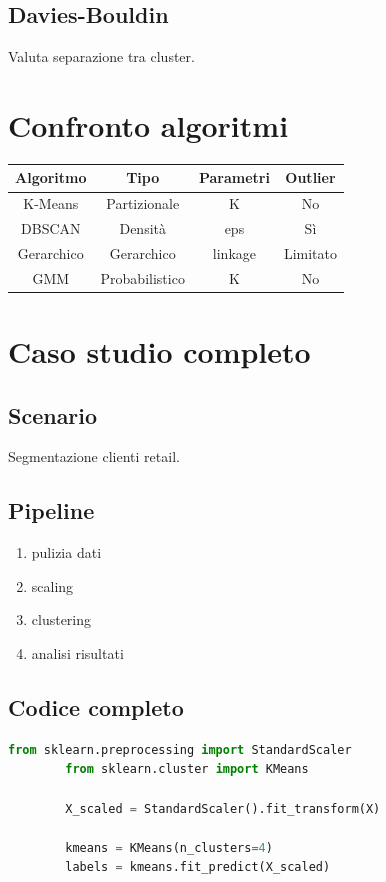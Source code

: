 \documentclass[12pt,a4paper]{article}
\begin{document}
	\subsection{Davies-Bouldin}
	
	Valuta separazione tra cluster.
	
	\section{Confronto algoritmi}
	
	\begin{longtable}{|c|c|c|c|}
		\hline
		Algoritmo & Tipo & Parametri & Outlier \\
		\hline
		K-Means & Partizionale & K & No \\
		DBSCAN & Densità & eps & Sì \\
		Gerarchico & Gerarchico & linkage & Limitato \\
		GMM & Probabilistico & K & No \\
		\hline
	\end{longtable}
	
	\section{Caso studio completo}
	
	\subsection{Scenario}
	
	Segmentazione clienti retail.
	
	\subsection{Pipeline}
	
	\begin{enumerate}
		\item pulizia dati
		\item scaling
		\item clustering
		\item analisi risultati
	\end{enumerate}
	
	\subsection{Codice completo}
	
	\begin{lstlisting}[language=Python]
		from sklearn.preprocessing import StandardScaler
		from sklearn.cluster import KMeans
		
		X_scaled = StandardScaler().fit_transform(X)
		
		kmeans = KMeans(n_clusters=4)
		labels = kmeans.fit_predict(X_scaled)
	\end{lstlisting}
	
\end{document}
